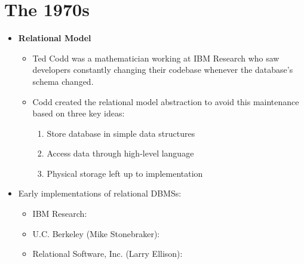 \documentclass[11pt]{article}
\begin{document}
\section{The 1970s}
\begin{itemize}
    \item \textbf{Relational Model}~\cite{codd70}
    \begin{itemize}
        \item
        Ted Codd was a mathematician working at IBM Research who saw developers constantly 
        changing their codebase whenever the database's schema changed.
        
        \item
        Codd created the relational model abstraction to avoid this maintenance based on three key 
        ideas:
        \begin{enumerate}
            \item Store database in simple data structures
            \item Access data through high-level language
            \item Physical storage left up to implementation
        \end{enumerate}
    \end{itemize}
    \item Early implementations of relational DBMSs:
    \begin{itemize}
        \item IBM Research: 
        \item U.C. Berkeley (Mike Stonebraker): 
        \item Relational Software, Inc. (Larry Ellison): 
    \end{itemize}
\end{itemize}
\end{document}
